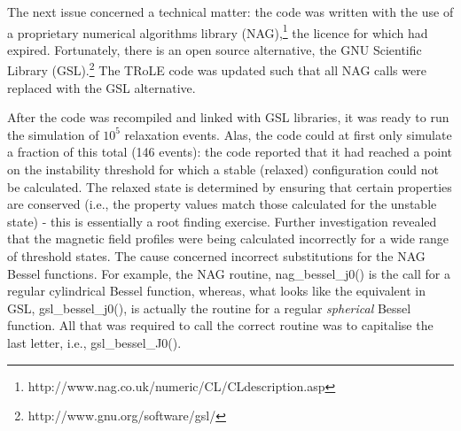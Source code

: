 The next issue concerned a technical matter: the code was written with the use of a proprietary numerical algorithms library (NAG),\footnote{http://www.nag.co.uk/numeric/CL/CLdescription.asp} the licence for which had expired. Fortunately, there is an open source alternative, the GNU Scientific Library (GSL).\footnote{http://www.gnu.org/software/gsl/} The TRoLE code was updated such that all NAG calls were replaced with the GSL alternative. 

After the code was recompiled and linked with GSL libraries, it was ready to run the simulation of $10^5$ relaxation events. Alas, the code could at first only simulate a fraction of this total (146 events): the code reported that it had reached a point on the instability threshold for which a stable (relaxed) configuration could not be calculated. The relaxed state is determined by ensuring that certain properties are conserved (i.e., the property values match those calculated for the unstable state) - this is essentially a root finding exercise. Further investigation revealed that the magnetic field profiles were being calculated incorrectly for a wide range of threshold states. The cause concerned incorrect substitutions for the NAG Bessel functions. For example, the NAG routine, nag\_bessel\_j0() is the call for a regular cylindrical Bessel function, whereas, what looks like the equivalent in GSL, gsl\_bessel\_j0(), is actually the routine for a regular \textit{spherical} Bessel function. All that was required to call the correct routine was to capitalise the last letter, i.e., gsl\_bessel\_J0().
 
